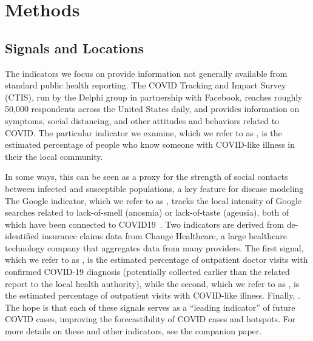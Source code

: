 \documentclass[9pt,twocolumn,twoside,lineno]{pnas-new}
\begin{document}
\section{Methods}

\subsection{Signals and Locations}

The indicators we focus on provide information not generally available from
standard public health reporting. The COVID Tracking and Impact Survey (CTIS),
run by the Delphi group in partnership with Facebook, reaches roughly 50,000
respondents across the United States daily, and provides information on
symptoms, social distancing, and other attitudes and behaviors related to
COVID. The particular indicator we examine, which we refer to as \fb, is the
estimated percentage of people who know someone with COVID-like illness in their
the local community. 

In some ways, this can be seen as a
proxy for the strength of social contacts between infected and susceptible
populations, a key feature for disease modeling~\cite{Zhang1481} The Google
indicator, which we refer to as \gs, tracks the local intensity of Google searches related to lack-of-smell
(anosmia) or lack-of-taste (ageusia), both of which have been connected to
COVID19~\cite{KlopfenAnosmia,vaira2020anosmia}. Two
indicators are derived from de-identified insurance claims data from Change Healthcare, a large
healthcare technology company that aggregates data from many providers. The
first signal, which we refer to as \chngcov, is the estimated percentage of outpatient doctor visits with
confirmed COVID-19 diagnosis (potentially collected earlier than the related
report to the local health authority), while the second, which we
refer to as \chngcli, is the estimated percentage of outpatient
visits with COVID-like illness. Finally, .  The hope is that each
of these signals serves as a ``leading indicator'' of future COVID cases,
improving the forecastibility of COVID cases and hotspots. For more details on
these and other indicators, see the companion paper.

\end{document}
